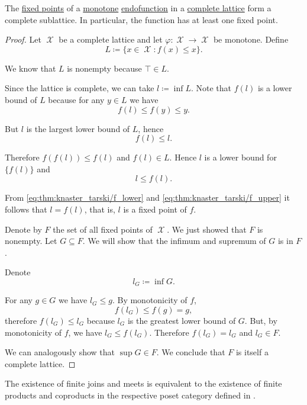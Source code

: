 \begin{theorem}\label{thm:knaster_tarski_theorem}
  The \hyperref[def:fixed_point]{fixed points} of a \hyperref[def:preordered_set/homomorphism]{monotone} \hyperref[def:endofunction]{endofunction} in a \hyperref[def:lattice]{complete lattice} form a complete sublattice. In particular, the function has at least one fixed point.
\end{theorem}
\begin{proof}
  Let \( \mscrX \) be a complete lattice and let \( \varphi: \mscrX \to \mscrX \) be monotone. Define
  \begin{equation*}
    L \coloneqq \{ x \in \mscrX \colon f(x) \leq x \}.
  \end{equation*}

  We know that \( L \) is nonempty because \( \top \in L \).

  Since the lattice is complete, we can take \( l \coloneqq \inf L \). Note that \( f(l) \) is a lower bound of \( L \) because for any \( y \in L \) we have
  \begin{equation*}
    f(l) \leq f(y) \leq y.
  \end{equation*}

  But \( l \) is the largest lower bound of \( L \), hence
  \begin{equation}\label{eq:thm:knaster_tarski/f_lower}
    f(l) \leq l.
  \end{equation}

  Therefore \( f(f(l)) \leq f(l) \) and \( f(l) \in L \). Hence \( l \) is a lower bound for \( \{ f(l) \} \) and
  \begin{equation}\label{eq:thm:knaster_tarski/f_upper}
    l \leq f(l).
  \end{equation}

  From \eqref{eq:thm:knaster_tarski/f_lower} and \eqref{eq:thm:knaster_tarski/f_upper} it follows that \( l = f(l) \), that is, \( l \) is a fixed point of \( f \).

  Denote by \( F \) the set of all fixed points of \( \mscrX \). We just showed that \( F \) is nonempty. Let \( G \subseteq F \). We will show that the infimum and supremum of \( G \) is in \( F \).

  Denote
  \begin{equation*}
    l_G \coloneqq \inf G.
  \end{equation*}

  For any \( g \in G \) we have \( l_G \leq g \). By monotonicity of \( f \),
  \begin{equation*}
    f(l_G) \leq f(g) = g,
  \end{equation*}
  therefore \( f(l_G) \leq l_G \) because \( l_G \) is the greatest lower bound of \( G \). But, by monotonicity of \( f \), we have \( l_G \leq f(l_G) \). Therefore \( f(l_G) = l_G \) and \( l_G \in F \).

  We can analogously show that \( \sup G \in F \). We conclude that \( F \) is itself a complete lattice.
\end{proof}

\begin{remark}\label{def:lattice_categorical_product}
  The existence of finite joins and meets is equivalent to the existence of finite products and coproducts in the respective poset category defined in .
\end{remark}
